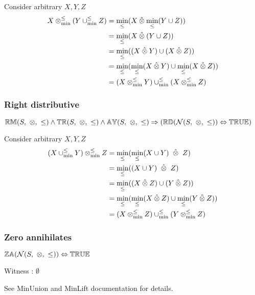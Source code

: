 \documentclass[../Summary.tex]{subfiles}
\begin{document}
\proof

Consider arbitrary $X,Y,Z$
\begin{align*}
X \mathbin{\otimes_{\min}^{\leq}} (Y \mathbin{\cup_{\min}^{\leq}} Z) 	& = \min_\leq(X \mathbin{\hat{\otimes}} \min_\leq(Y \cup Z)) \\
							& = \min_\leq(X \mathbin{\hat{\otimes}} (Y \cup Z)) \\
							& = \min_\leq((X \mathbin{\hat{\otimes}} Y) \cup (X \mathbin{\hat{\otimes}} Z)) \\
							& = \min_\leq(\min_\leq(X \mathbin{\hat{\otimes}} Y) \cup \min_\leq(X \mathbin{\hat{\otimes}} Z)) \\
							& = (X \mathbin{\otimes_{\min}^{\leq}} Y) \mathbin{\cup_{\min}^{\leq}} (X \mathbin{\otimes_{\min}^{\leq}} Z)
\end{align*}



\subsubsection{Right distributive}

$\propname{RM}(S,\ \otimes,\ \leq) \wedge \propname{TR}(S,\ \otimes,\ \leq) \wedge \propname{AY}(S,\ \otimes, \ \leq) \Rightarrow (\propname{RD}(\mathcal{N}(S,\ \otimes,\ \leq))  \Leftrightarrow \propname{TRUE})$

\proof

Consider arbitrary $X,Y,Z$
\begin{align*}
(X \minunion Y) \minlift Z 	& = \min_\leq(\min_\leq(X \cup Y) \ \lift \ Z) \\
							& = \min_\leq((X \cup Y) \ \lift \ Z) \\
							& = \min_\leq((X \lift Z) \cup (Y \lift Z)) \\
							& = \min_\leq(\min_\leq(X \lift Z) \cup \min_\leq(Y \lift Z)) \\
							& = (X \minlift Z) \minunion (Y \minlift Z)
\end{align*}



\subsubsection{Zero annihilates}

$\propname{ZA}(\mathcal{N}(S,\ \otimes,\ \leq)) \Leftrightarrow \propname{TRUE}$

\proof

Witness : $\emptyset$

\vspace{0.5em}

See MinUnion and MinLift documentation for details.
\end{document}

